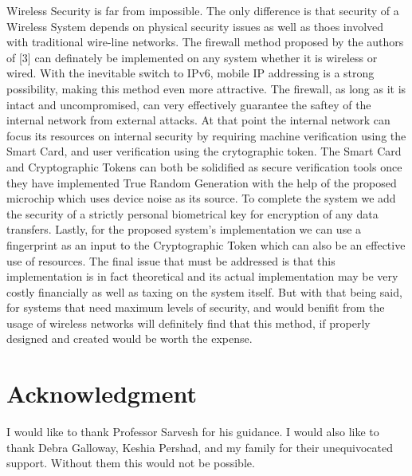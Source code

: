 \documentclass[11pt,onecolumn,cspaper,compsoc]{IEEEtran}
\begin{document}
Wireless Security is far from impossible. The only difference is that security of a Wireless System depends on physical security issues as well as thoes involved with traditional 
wire-line networks. The firewall method proposed by the authors of [3] can definately be implemented on any system whether it is wireless or wired. With the inevitable switch to IPv6, mobile IP
addressing is a strong possibility, making this method even more attractive. The firewall, as long as it is intact and uncompromised, can very effectively guarantee the saftey of the internal 
network from external attacks. At that point the internal network can focus its resources on internal security by requiring machine verification using the Smart Card, and user verification using 
the crytographic token. The Smart Card and Cryptographic Tokens can both be solidified as secure verification tools once they have implemented True Random Generation with the help of the proposed 
microchip which uses device noise as its source. To complete the system we add the security of a strictly personal biometrical key for encryption of any data transfers. Lastly, 
for the proposed system's implementation we can use a fingerprint as an input to the Cryptographic Token which can also be an effective use of resources. The final issue that must be 
addressed is that this implementation is in fact theoretical and its actual implementation may be very costly financially as well as taxing on the system itself. But with that being said, for 
systems that need maximum levels of security, and would benifit from the usage of wireless networks will definitely find that this method, if properly designed and created would be worth the expense.  
  


\section*{Acknowledgment}

I would like to thank Professor Sarvesh for his guidance. I would also like to thank Debra Galloway, Keshia Pershad, and my family for their unequivocated support. Without them this would not be possible.
\end{document}
